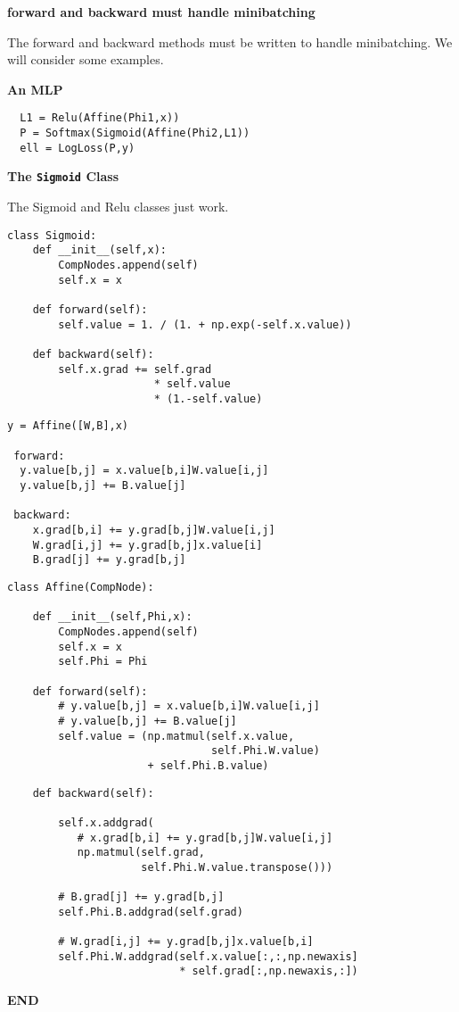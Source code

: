 \documentclass[landscape]{article}
\newcommand{\slide}[1]{
  \vfill
  \centerline{\Large\thepage}
  \eject
  \centerline{\bf #1}
  \vfill}
\begin{document}
{\slide{forward and backward must handle minibatching}

The forward and backward methods must be written to handle minibatching.  We will consider some examples.


\slide{An MLP}

\vfill
\begin{verbatim}
  L1 = Relu(Affine(Phi1,x))
  P = Softmax(Sigmoid(Affine(Phi2,L1))
  ell = LogLoss(P,y)
\end{verbatim}


\slide{The {\tt Sigmoid} Class}

The Sigmoid and Relu classes just work.

\begin{verbatim}
class Sigmoid:
    def __init__(self,x):
        CompNodes.append(self)
        self.x = x

    def forward(self):
        self.value = 1. / (1. + np.exp(-self.x.value))

    def backward(self):
        self.x.grad += self.grad
                       * self.value
                       * (1.-self.value)
\end{verbatim}


\vfill
\eject
\begin{verbatim}
y = Affine([W,B],x)

 forward:
  y.value[b,j] = x.value[b,i]W.value[i,j]
  y.value[b,j] += B.value[j]

 backward:
    x.grad[b,i] += y.grad[b,j]W.value[i,j]
    W.grad[i,j] += y.grad[b,j]x.value[i]
    B.grad[j] += y.grad[b,j]
\end{verbatim}

\vfill
\eject
\begin{verbatim}
class Affine(CompNode):

    def __init__(self,Phi,x):
        CompNodes.append(self)
        self.x = x
        self.Phi = Phi

    def forward(self):
        # y.value[b,j] = x.value[b,i]W.value[i,j]
        # y.value[b,j] += B.value[j]
        self.value = (np.matmul(self.x.value,
                                self.Phi.W.value)
                      + self.Phi.B.value)
\end{verbatim}
\vfill
\eject
\vfill
\begin{verbatim}
    def backward(self):

        self.x.addgrad(
           # x.grad[b,i] += y.grad[b,j]W.value[i,j]
           np.matmul(self.grad,
                     self.Phi.W.value.transpose()))

        # B.grad[j] += y.grad[b,j]
        self.Phi.B.addgrad(self.grad)

        # W.grad[i,j] += y.grad[b,j]x.value[b,i]
        self.Phi.W.addgrad(self.x.value[:,:,np.newaxis]
                           * self.grad[:,np.newaxis,:])
\end{verbatim}

\slide{END}
}
\end{document}

